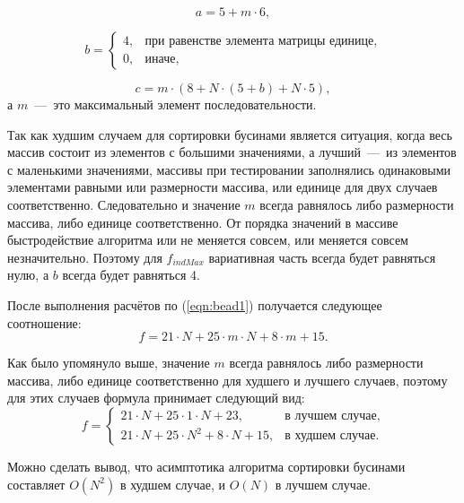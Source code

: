 \begin{equation}
	a = 5 + m \cdot 6,
\end{equation}

\begin{equation}
	b = \begin{cases}
		4,& \text{при равенстве элемента матрицы единице}, \\
		0,& \text{иначе},
	\end{cases}
\end{equation}

\begin{equation}
	c = m \cdot (8 + N \cdot (5 + b) + N \cdot 5),
\end{equation}
а $m$~---~это максимальный элемент последовательности.

Так как худшим случаем для сортировки бусинами является ситуация, когда весь массив состоит из элементов с большими значениями, а лучший~---~из элементов с маленькими значениями, массивы при тестировании заполнялись одинаковыми элементами равными или размерности массива, или единице для двух случаев соответственно. Следовательно и значение $m$ всегда равнялось либо размерности массива, либо единице соответственно. От порядка значений в массиве быстродействие алгоритма или не меняется совсем, или меняется совсем незначительно. Поэтому для $f_{indMax}$ вариативная часть всегда будет равняться нулю, а $b$ всегда будет равняться 4.

После выполнения расчётов по (\ref{eqn:bead1}) получается следующее соотношение:
\begin{equation}
	f = 21 \cdot N + 25 \cdot m \cdot N + 8 \cdot m + 15.
\end{equation}

Как было упомянуло выше, значение $m$ всегда равнялось либо размерности массива, либо единице соответственно для худшего и лучшего случаев, поэтому для этих случаев формула принимает следующий вид:
\begin{equation}
	f = \begin{cases}
		21 \cdot N + 25 \cdot 1 \cdot N + 23,& \text{в лучшем случае}, \\
		21 \cdot N + 25 \cdot N^2 + 8 \cdot N + 15,& \text{в худшем случае}.
	\end{cases}
\end{equation}

Можно сделать вывод, что асимптотика алгоритма сортировки бусинами составляет $O(N^2)$ в худшем случае, и $O(N)$ в лучшем случае.

\newpage